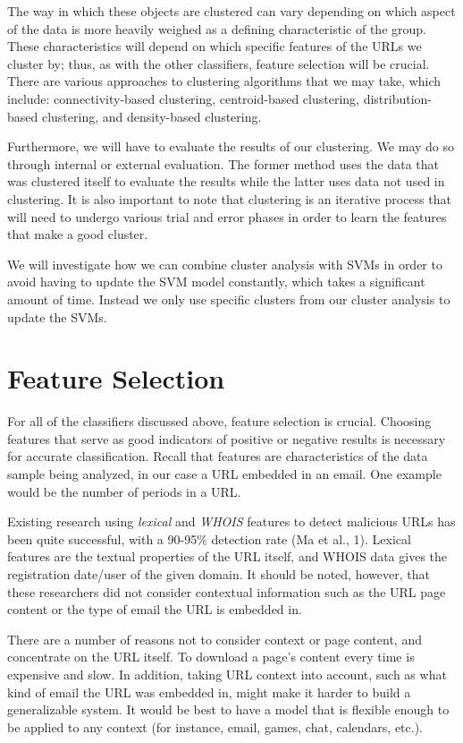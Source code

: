 \documentclass[cs,proposal]{hmcclinic}
\begin{document}
The way in which these objects are clustered can vary depending on which aspect of the data is more heavily weighed as a defining characteristic of the group. These characteristics will depend on which specific features of the URLs we cluster by; thus, as with the other classifiers, feature selection will be crucial. There are various approaches to clustering algorithms that we may take, which include: connectivity-based clustering, centroid-based clustering, distribution-based clustering, and density-based clustering. 

Furthermore, we will have to evaluate the results of our clustering. We may do so through internal or external evaluation. The former method uses the data that was clustered itself to evaluate the results while the latter uses data not used in clustering. It is also important to note that clustering is an iterative process that will need to undergo various trial and error phases in order to learn the features that make a good cluster.

We will investigate how we can combine cluster analysis with SVMs in order to avoid having to update the SVM model constantly, which takes a significant amount of time. Instead we only use specific clusters from our cluster analysis to update the SVMs.


\section{Feature Selection} \label{feature-selection}

For all of the classifiers discussed above, feature selection is crucial. Choosing features that serve as good indicators of positive or negative results is necessary for accurate classification. Recall that features are characteristics of the data sample being analyzed, in our case a URL embedded in an email. One example would be the number of periods in a URL.

Existing research using \textit{lexical} and \textit{WHOIS} features to detect malicious URLs has been quite successful, with a 90-95\% detection rate (Ma et al., 1). Lexical features are the textual properties of the URL itself, and WHOIS data gives the registration date/user of the given domain. It should be noted, however, that these researchers did not consider contextual information such as the URL page content or the type of email the URL is embedded in.

There are a number of reasons not to consider context or page content, and concentrate on the URL itself. To download a page's content every time is expensive and slow. In addition, taking URL context into account, such as what kind of email the URL was embedded in, might make it harder to build a generalizable system. It would be best to have a model that is flexible enough to be applied to any context (for instance, email, games, chat, calendars, etc.). 
\end{document}

